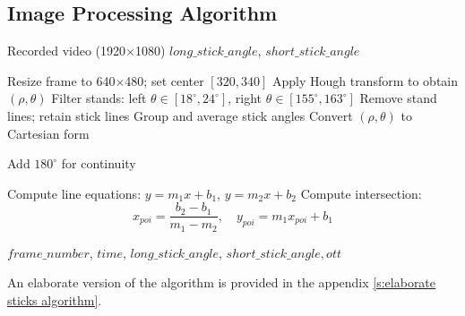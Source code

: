 \documentclass[letterpaper, 10pt, conference]{IEEEtran}
\begin{document}
        \subsection{Image Processing Algorithm }
            \begin{algorithm}[ht]
                \caption{Sticks Angles Data Acquisition per Frame}
                \label{alg:sticks_detection_algorithm}
                \footnotesize
                    \begin{algorithmic}[1]
                    
                    \REQUIRE Recorded video (1920$\times$1080)
                    \ENSURE $long\_stick\_angle$, $short\_stick\_angle$
                    
                    \STATE Resize frame to 640$\times$480; set center $[320,340]$
                    \STATE Apply Hough transform to obtain $(\rho,\theta)$
                    \STATE Filter stands:
                           left $\theta \in [18^\circ,24^\circ]$,
                           right $\theta \in [155^\circ,163^\circ]$
                    \STATE Remove stand lines; retain stick lines
                    \STATE Group and average stick angles
                    \STATE Convert $(\rho,\theta)$ to Cartesian form
                    
                        \STATE Add $180^\circ$ for continuity
                    \ENDFOR
                    
                    \STATE Compute line equations:
                           $y=m_1x+b_1$, $y=m_2x+b_2$
                    \STATE Compute intersection:
                           \[
                           x_{poi}=\frac{b_2-b_1}{m_1-m_2},
                           \quad
                           y_{poi}=m_1x_{poi}+b_1
                           \]
                    
                    \RETURN $frame\_number$, $time$,
                            $long\_stick\_angle$,
                            $short\_stick\_angle, ott$
                    
                    \end{algorithmic}
                An elaborate version of the algorithm is provided in the appendix \ref{s:elaborate sticks algorithm}.
            \end{algorithm}
            
\end{document}

